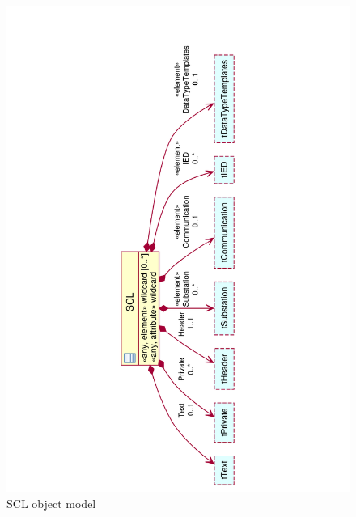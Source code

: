 \begin{landscape}
	\begin{figure}
	  \includegraphics[angle=-90, width=1.0\linewidth]{chapters/ch-scl/figures/SCL-uml-Deept2}
	  \caption{SCL object model}  
	  \label{fig:pdf-SCL-uml-deept2}
	\end{figure}
\end{landscape}


